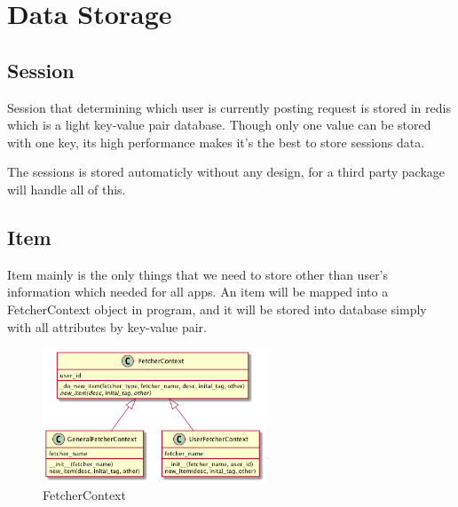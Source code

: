 \section{Data Storage}
  \subsection{Session}
    Session that determining which user is currently posting request is stored in redis which is a light key-value pair database.
    Though only one value can be stored with one key, its high performance makes it's the best to store sessions data.

    The sessions is stored automaticly without any design, for a third party package will handle all of this.

  \subsection{Item}
    Item mainly is the only things that we need to store other than user's information which needed for all apps.
    An item will be mapped into a FetcherContext object in program, and it will be stored into database simply with all attributes
    by key-value pair.

    \begin{figure}[H]
      \centering
      \includegraphics[width=0.6\textwidth]{img/fetcherContext.png}
      \caption{FetcherContext\label{fig:fetcherContext}}
    \end{figure}
